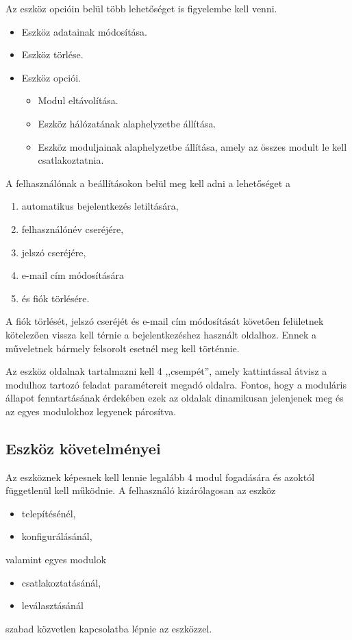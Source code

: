 \documentclass{thesis-ekf}
\theoremstyle{definition}
\theoremstyle{remark}
\begin{document}
	Az eszköz opcióin belül több lehetőséget is figyelembe kell venni.
	\begin{itemize}
		\item Eszköz adatainak módosítása.
		\item Eszköz törlése.
		\item Eszköz opciói.
		\begin{itemize}
			\item Modul eltávolítása.
			\item Eszköz hálózatának alaphelyzetbe állítása.
			\item Eszköz moduljainak alaphelyzetbe állítása, amely az összes modult le kell csatlakoztatnia.
		\end{itemize}
	\end{itemize}
	
	A felhasználónak a beállításokon belül meg kell adni a lehetőséget a
	\begin{enumerate}
		\item automatikus bejelentkezés letiltására,
		\item felhasználónév cseréjére,
		\item jelszó cseréjére,
		\item e-mail cím módosítására
		\item és fiók törlésére.
	\end{enumerate}
	A fiók törlését, jelszó cseréjét és e-mail cím módosítását követően felületnek kötelezően vissza kell térnie a bejelentkezéshez használt oldalhoz. Ennek a műveletnek bármely felsorolt esetnél meg kell történnie.
	
	Az eszköz oldalnak tartalmazni kell 4 ,,csempét'', amely kattintással átvisz a modulhoz tartozó feladat paramétereit megadó oldalra. Fontos, hogy a moduláris állapot fenntartásának érdekében ezek az oldalak dinamikusan jelenjenek meg és az egyes modulokhoz legyenek párosítva. 
	\subsection{Eszköz követelményei}
	Az eszköznek képesnek kell lennie legalább 4 modul fogadására és azoktól függetlenül kell működnie.
	A felhasználó kizárólagosan az eszköz
	\begin{itemize}
		\item telepítésénél,
		\item konfigurálásánál,
	\end{itemize}
	valamint egyes modulok
	\begin{itemize}
		\item csatlakoztatásánál,
		\item leválasztásánál
	\end{itemize}
	szabad közvetlen kapcsolatba lépnie az eszközzel.
	
\end{document}
